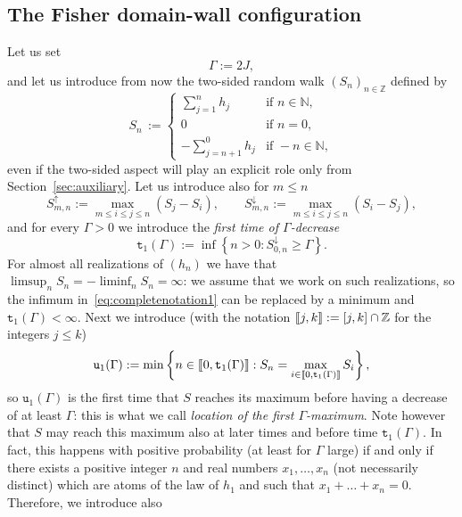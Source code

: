 \documentclass[AHL,Unicode,longabstracts,published]{cedram}
\newcommand{\bbN}{\mathbb{N}}
\newcommand{\bbZ}{\mathbb{Z}}
\newcommand{\gG}{\Gamma}
\renewcommand*\ss{\mathtt{u}}
\newcommand{\ttt}{\mathtt{t}}
\newcommand{\tu}{\ss}
\newcommand{\llbracket}{\mathopen{[\mkern -2.7mu[}}
\newcommand{\rrbracket}{\mathclose{]\mkern -2.7mu]}}
\newcommand{\lbra}{\llbracket}
\newcommand{\rbra}{\rrbracket}
\begin{document}
\subsection{The Fisher domain-wall configuration}\label{sec:Fisher}
Let us set
\begin{equation}
\gG:= 2 J,
\end{equation}
and let us introduce from now the two-sided random walk $(S_n)_{n \in \bbZ}$ defined by
\begin{equation}\label{eq:Sn}
S_n\, :=
\begin{cases}
\displaystyle\sum_{j=1}^n h_j & \text{if } n \in \bbN,\\
0 & \text{if } n=0,\\
\displaystyle-\sum_{j=n+1}^0 h_j& \text{if } -n \in \bbN,
\end{cases}
\end{equation}
even if the two-sided aspect will play an explicit role only from Section~\ref{sec:auxiliary}. Let us introduce also for $m\le n$
\begin{equation}
S^\uparrow_{m,n} :=  \max_{m\le i\le j\le n} (S_j-S_i), \qquad S^\downarrow_{m,n}:= \max_{m\le i\le j\le n} (S_i-S_j),
\end{equation}
and for every $\gG>0$ we introduce the \emph{first time of $\gG$-decrease}
\begin{equation}\label{eq:completenotation1}
\ttt_1(\gG):= \inf\left\{n > 0: S^\downarrow_{0,n} \ge \gG\right\}.
\end{equation}
For almost all realizations of $(h_n)$ we have that $\limsup_n S_n=-\liminf_n S_n= \infty$: we assume that we work on such realizations, so the infimum in~\eqref{eq:completenotation1} can be replaced by a minimum and $\ttt_1(\gG)<\infty$. Next we introduce (with the notation $\lbra j, k\rbra:=[j, k] \cap \bbZ$ for the integers $j\le k$)
\begin{equation}\label{eq:completenotation2}
\tu_1(\gG):= \min\left\{ n \in \lbra 0, \ttt_1(\gG)\rbra: S_n= \max_{i \in \lbra 0, \ttt_1(\gG)\rbra} S_i\right\},
\end{equation}
so $\tu_1(\gG)$ is the first time that $S$ reaches its maximum before having a decrease of at least $\gG$: this is what we call \emph{location of the first $\gG$-maximum}. Note however that $S$ may reach this maximum also at later times and before time $\ttt_1(\gG)$. In fact, this happens with positive probability (at least for $\gG$ large) if and only if there exists a positive integer $n$ and real numbers $x_1, \dots, x_n$ (not necessarily distinct) which are atoms of the law of $h_1$ and such that $x_1+\dots+ x_n=0$. Therefore, we introduce also
\end{document}
